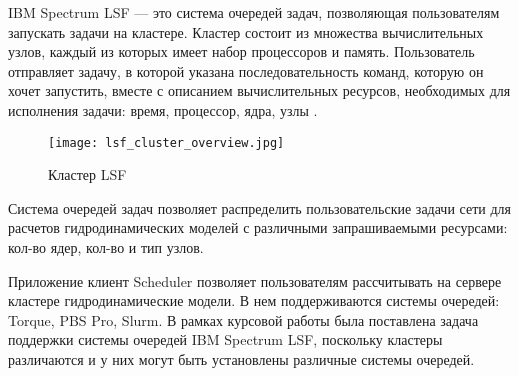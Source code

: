 

IBM Spectrum LSF --- это система очередей задач, позволяющая пользователям запускать задачи на кластере. Кластер состоит из множества вычислительных узлов, каждый из которых имеет набор процессоров и память. Пользователь отправляет задачу, в которой указана последовательность команд, которую он хочет запустить, вместе с описанием вычислительных ресурсов, необходимых для исполнения задачи: время, процессор, ядра, узлы \cite{hpc-llnl}.

\begin{figure}[h]
    \centering
    \texttt{[image: lsf\_cluster\_overview.jpg]}
    \caption{Кластер LSF}
    \label{fig:LSF_cluster}
\end{figure}

Система очередей задач позволяет распределить пользовательские задачи сети для расчетов гидродинамических моделей с различными запрашиваемыми ресурсами: кол-во ядер, кол-во и тип узлов.

Приложение клиент Scheduler позволяет пользователям рассчитывать на сервере кластере гидродинамические модели. В нем поддерживаются системы очередей: Torque, PBS Pro, Slurm. В рамках курсовой работы была поставлена задача поддержки системы очередей IBM Spectrum LSF, поскольку кластеры различаются и у них могут быть установлены различные системы очередей.

\clearpage

